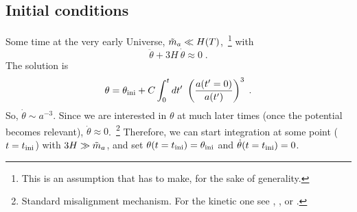 \documentclass[10pt,utf8,compress,xcolor=dvipsnames]{beamer}
\begin{document}
\subsection{Initial conditions}
\begin{frame}{\insertsubsectionhead}
	Some time at the very early Universe, $\tilde m_{a}{} \ll H(T)$,~\footnote{\fontF This is an assumption that \mimes has to make, for the sake of generality.} with
	\begin{equation*}
		\ddot{\theta}  + 3H \ \dot{\theta} \approx 0 \;.
	\end{equation*}	
	The solution is 
	$$
	\theta = \theta_{\rm ini}{} + C \displaystyle \int_{0}^t d t' \ \left(  \dfrac{a(t'=0)}{a(t')}  \right)^3 \;.
	$$
	So, $\dot{\theta} \sim a^{-3}$. Since we are interested in $\theta$ at much later times (once the potential becomes relevant), $\dot{\theta} \approx 0$.~\footnote{\fontF Standard misalignment mechanism. For the kinetic one see
	,
	, or 
	.	
	}
	Therefore, we can start integration at some point ($t=t_{\rm ini}{}$) with $3H \gg \tilde m_{a}{}$, and set $\theta(t=t_{\rm ini}{}) = \theta_{\rm ini}{}$ and $\dot \theta(t=t_{\rm ini}{}) = 0$. 

\end{frame}
\end{document}
